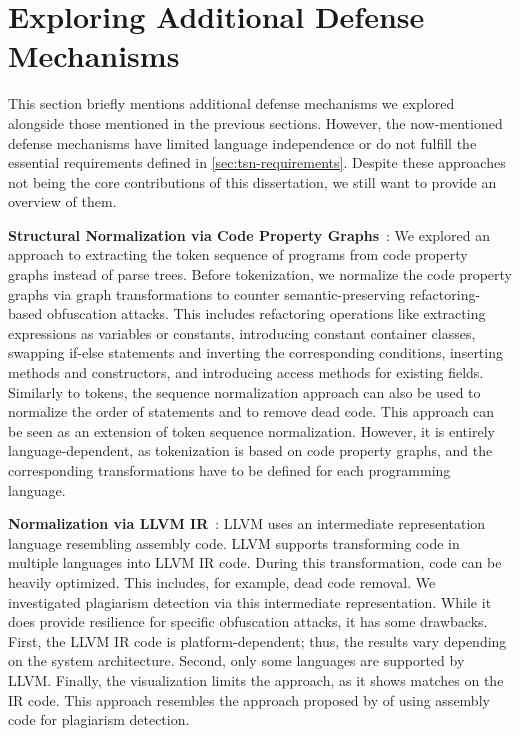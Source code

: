 \section{Exploring Additional Defense Mechanisms}\label{sec:other-defense}
This section briefly mentions additional defense mechanisms we explored alongside those mentioned in the previous sections. However, the now-mentioned defense mechanisms have limited language independence or do not fulfill the essential requirements defined in \autoref{sec:tsn-requirements}.
Despite these approaches not being the core contributions of this dissertation, we still want to provide an overview of them. %

\textbf{Structural Normalization via Code Property Graphs}~\cite{Maisch2024}: We explored an approach to extracting the token sequence of programs from code property graphs instead of parse trees. Before tokenization, we normalize the code property graphs via graph transformations to counter semantic-preserving refactoring-based obfuscation attacks.
This includes refactoring operations like extracting expressions as variables or constants, introducing constant container classes, swapping if-else statements and inverting the corresponding conditions, inserting methods and constructors, and introducing access methods for existing fields.
Similarly to tokens, the sequence normalization approach can also be used to normalize the order of statements and to remove dead code. This approach can be seen as an extension of token sequence normalization. However, it is entirely language-dependent, as tokenization is based on code property graphs, and the corresponding transformations have to be defined for each programming language.

\textbf{Normalization via LLVM IR}~\cite{Heneka2023}: LLVM uses an intermediate representation language resembling assembly code. LLVM supports transforming code in multiple languages into LLVM IR code. During this transformation, code can be heavily optimized. This includes, for example, dead code removal. We investigated plagiarism detection via this intermediate representation. While it does provide resilience for specific obfuscation attacks, it has some drawbacks. First, the LLVM IR code is platform-dependent; thus, the results vary depending on the system architecture. Second, only some languages are supported by LLVM. Finally, the visualization limits the approach, as it shows matches on the IR code. This approach resembles the approach proposed by \citet{DevoreMcDonald2020} of using assembly code for plagiarism detection.


